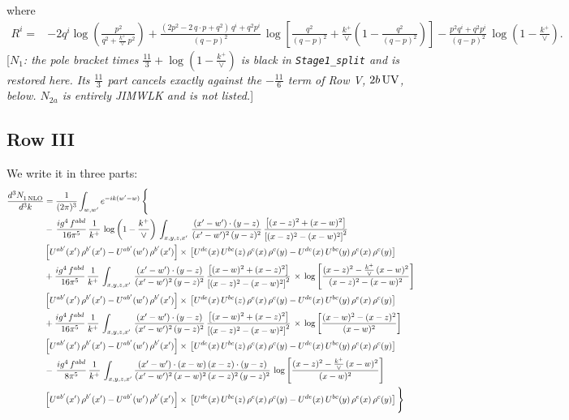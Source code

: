 \documentclass[9pt]{article}
\numberwithin{equation}{section}
\newcommand{\rnote}[1]{{\color{teal}[\textit{#1}]}}
\begin{document}
where
\begin{align}
R^{i} =& -2q^{i}\log\left(\frac{p^{2}}{q^{2}+\frac{k^{+}}{\vee}\,p^{2}}\right)
+\frac{(2p^{2}-2\,q\cdot p+q^{2})\,q^{i}+q^{2}p^{i}}{(q-p)^{2}}\,
\log\left[\frac{q^{2}}{(q-p)^{2}}+\frac{k^{+}}{\vee}\left(1-\frac{q^{2}}{(q-p)^{2}}\right)\right]
-\frac{p^{2}q^{i}+q^{2}p^{i}}{(q-p)^{2}}\,\log\left(1-\frac{k^{+}}{\vee}\right).
\end{align}
\rnote{$N_{1}$: the pole bracket times $\frac{11}{3}+\log(1-\frac{k^{+}}{\vee})$ is black in \texttt{Stage1\_split} and is restored here. Its $\frac{11}{3}$ part cancels exactly against the $-\frac{11}{6}$ term of Row V, $2b\,{\rm UV}$, below. $N_{2a}$ is entirely JIMWLK and is not listed.}
\subsection{Row III}
We write it in three parts:
\begin{align}
   \frac{d^{3}N_{1\,\rm NLO}^{\rm}}{d^{3}k}  & =  \frac{1}{(2\pi)^{3}}  \int_{w, w^\prime} e^{-ik(w^\prime-w)}\, \Bigg\{\notag \\
& -\,\frac{ig^{4}\,f^{abd}}{16\pi^{5}}\,\frac{1}{k^{+}}\,\log{\left(1-\frac{k^{+}}{\vee}\right)}\,\int_{x,y,z,x'}\, \frac{(x'-w')\cdot (y-z)}{(x'-w')^{2}\,(y-z)^{2}}\,\frac{\left[(x-z)^{2}+(x-w)^{2}\right]}{\left[(x-z)^{2}-(x-w)^{2}\right]^{2}}\notag \\ & \left[U^{ab'}(x')\,\rho^{b'}(x')-U^{ab'}(w')\, \rho^{b'}(x')\right]\times\, \left[U^{de}(x)\,U^{bc}(z)\, \rho^{e}(x)\,\rho^{c}(y)-U^{de}(x)\,U^{bc}(y)\,\rho^{e}(x)\,\rho^{c}(y)\right] \notag \\
&  +\frac{ig^{4}\,f^{abd}}{16\pi^{5}}\, \frac{1}{k^{+}}\,\int_{x,y,z,x'}\, \frac{(x'-w')\cdot (y-z)}{(x'-w')^{2}\,(y-z)^{2}}\, \frac{\left[(x-w)^{2}+(x-z)^{2}\right]}{\left[(x-z)^{2}-(x-w)^{2}\right]^{2}}\, \times\, \log{\left[\frac{(x-z)^{2}-\frac{k^{+}}{\vee}\,(x-w)^{2}}{(x-z)^{2}-(x-w)^{2}}\right]}\notag \\ & \left[U^{ab'}(x')\,\rho^{b'}(x')-U^{ab'}(w')\, \rho^{b'}(x')\right]\times\, \left[U^{de}(x)\,U^{bc}(z)\, \rho^{e}(x)\,\rho^{c}(y)-U^{de}(x)\,U^{bc}(y)\,\rho^{e}(x)\,\rho^{c}(y)\right] \notag \\
&  +\frac{ig^{4}\,f^{abd}}{16\pi^{5}}\, \frac{1}{k^{+}}\,\int_{x,y,z,x'}\, \frac{(x'-w')\cdot (y-z)}{(x'-w')^{2}\,(y-z)^{2}}\, \frac{\left[(x-w)^{2}+(x-z)^{2}\right]}{\left[(x-z)^{2}-(x-w)^{2}\right]^{2}}\, \times\, \log{\left[\frac{(x-w)^{2}-(x-z)^{2}}{(x-w)^{2}}\right]}\notag \\ & \left[U^{ab'}(x')\,\rho^{b'}(x')-U^{ab'}(w')\, \rho^{b'}(x')\right]\times\, \left[U^{de}(x)\,U^{bc}(z)\, \rho^{e}(x)\,\rho^{c}(y)-U^{de}(x)\,U^{bc}(y)\,\rho^{e}(x)\,\rho^{c}(y)\right] \notag \\
&-\, \frac{ig^{4}\,f^{abd}}{8\pi^{5}}\,\frac{1}{k^{+}}\,\int_{x,y,z,x'}\frac{(x'-w')\cdot (x-w)\, (x-z)\cdot (y-z)}{(x'-w')^{2}\, (x-w)^{2}\, (x-z)^{2}\, (y-z)^{2}}\,\log{\left[\frac{(x-z)^{2}-\frac{k^{+}}{\vee}\,(x-w)^{2}}{(x-w)^{2}}\right]} \notag \\ & \left[U^{ab'}(x')\,\rho^{b'}(x')-U^{ab'}(w')\, \rho^{b'}(x')\right]\times\, \left[U^{de}(x)\,U^{bc}(z)\, \rho^{e}(x)\,\rho^{c}(y)-U^{de}(x)\,U^{bc}(y)\,\rho^{e}(x)\,\rho^{c}(y)\right]\Bigg\}
\end{align}
\end{document}
